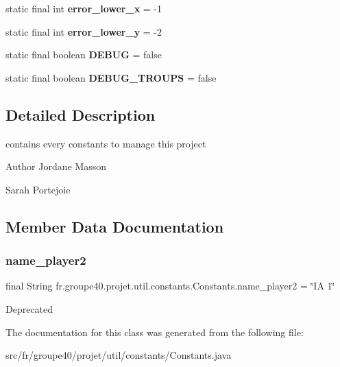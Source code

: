\begin{DoxyCompactItemize}
static final int {\bfseries error\+\_\+lower\+\_\+x} = -\/1
\item 
\mbox{\label{classfr_1_1groupe40_1_1projet_1_1util_1_1constants_1_1_constants_aa35e950df3e82f84cd4d4041672cccb3}} 
static final int {\bfseries error\+\_\+lower\+\_\+y} = -\/2
\item 
\mbox{\label{classfr_1_1groupe40_1_1projet_1_1util_1_1constants_1_1_constants_a24006b4d88ad0072face8e4db79923db}} 
static final boolean {\bfseries D\+E\+B\+UG} = false
\item 
\mbox{\label{classfr_1_1groupe40_1_1projet_1_1util_1_1constants_1_1_constants_a7a2f46b18ad98c4cce302790970ff9c3}} 
static final boolean {\bfseries D\+E\+B\+U\+G\+\_\+\+T\+R\+O\+U\+PS} = false
\end{DoxyCompactItemize}


\subsection{Detailed Description}
contains every constants to manage this project 

\begin{DoxyAuthor}{Author}
Jordane Masson 

Sarah Portejoie 
\end{DoxyAuthor}


\subsection{Member Data Documentation}
\mbox{\label{classfr_1_1groupe40_1_1projet_1_1util_1_1constants_1_1_constants_a71c5ccb106079fbc6e180ad452b38522}} 
\subsubsection{\texorpdfstring{name\+\_\+player2}{name\_player2}}
{\footnotesize\ttfamily final String fr.\+groupe40.\+projet.\+util.\+constants.\+Constants.\+name\+\_\+player2 = \char`\"{}IA 1\char`\"{}\hspace{0.3cm}{\ttfamily [static]}}

Deprecated 

The documentation for this class was generated from the following file\+:\begin{DoxyCompactItemize}
\item 
src/fr/groupe40/projet/util/constants/Constants.\+java\end{DoxyCompactItemize}

